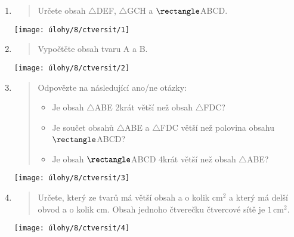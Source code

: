\begin{enumerate}
    \item
    \begin{minipage}[t]{\linewidth}
        \begin{quote}
            Určete obsah $\triangle$DEF, $\triangle$GCH a $\rectangle$ABCD.
        \end{quote}
        \centering
        \texttt{[image: úlohy/8/ctversit/1]}

    \end{minipage}

    \item
    \begin{minipage}[t]{\linewidth}
        \begin{quote}
            Vypočtěte obsah tvaru A a B.
        \end{quote}
        \centering
        \texttt{[image: úlohy/8/ctversit/2]}

    \end{minipage}

    \item
    \begin{minipage}[t]{\linewidth}
        \begin{quote}
            Odpovězte na následující ano/ne otázky:
            \begin{itemize}
                \item Je obsah $\triangle$ABE 2krát větší než obsah $\triangle$FDC?
                \item Je součet obsahů $\triangle$ABE a $\triangle$FDC větší než polovina obsahu $\rectangle$ABCD?
                \item Je obsah $\rectangle$ABCD 4krát větší než obsah $\triangle$ABE?
            \end{itemize}
        \end{quote}
        \centering
        \texttt{[image: úlohy/8/ctversit/3]}

    \end{minipage}

    \item
    \begin{minipage}[t]{\linewidth}
        \begin{quote}
            Určete, který ze tvarů má větší obsah a o kolik cm$^{2}$ a který má delší obvod a o kolik cm. Obsah jednoho čtverečku čtvercové sítě je $1\,\text{cm}^2$.
        \end{quote}
        \centering
        \texttt{[image: úlohy/8/ctversit/4]}


\end{minipage}
\end{enumerate}
